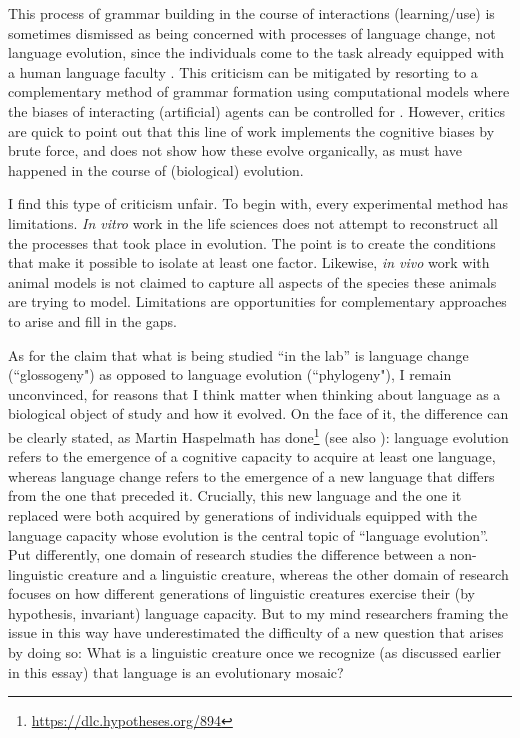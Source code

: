 This process of grammar building in the course of interactions (learning/use) is sometimes dismissed as being concerned with processes of language change, not language evolution, since the individuals come to the task already equipped with a human language faculty \citep{berwick2016only}. This criticism can be mitigated by resorting to a complementary method of grammar formation using computational models where the biases of interacting (artificial) agents can be controlled for \citep{kirby2001spontaneous,thompson2016culture}. However, critics are quick to point out that this line of work implements the cognitive biases by brute force, and does not show how these evolve organically, as must have happened in the course of (biological) evolution.

I find this type of criticism unfair. To begin with, every experimental method has limitations. \textit{In vitro} work in the life sciences does not attempt to reconstruct all the processes that took place in evolution. The point is to create the conditions that make it possible to isolate at least one factor. Likewise, \textit{in vivo} work with animal models is not claimed to capture all aspects of the species these animals are trying to model. Limitations are opportunities for complementary approaches to arise and fill in the gaps.

As for the claim that what is being studied ``in the lab'' is language change (``glossogeny") as opposed to language evolution
(``phylogeny"), I remain unconvinced, for reasons that I think matter when thinking about language as a biological object of study and how it evolved. On the face of it, the difference can be clearly stated, as Martin Haspelmath has done\footnote{\url{https://dlc.hypotheses.org/894}} (see also \cite{mendivil2019did}): language evolution refers to the emergence of a cognitive capacity to acquire at least one language, whereas language change refers to the emergence of a new language that differs from the one that preceded it. Crucially, this new language and the one it replaced were both acquired by generations of individuals equipped with the language capacity whose evolution is the central topic of ``language evolution''. Put differently, one domain of research studies the difference between a non-linguistic creature and a linguistic creature, whereas the other domain of research focuses on how different generations of linguistic creatures exercise their (by hypothesis, invariant) language capacity. But to my mind researchers framing the issue in this way have underestimated the difficulty of a new question that arises by doing so: What is a linguistic creature once we recognize (as discussed earlier in this essay) that language is an evolutionary mosaic?


